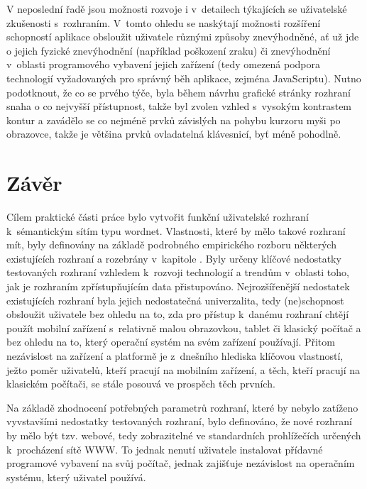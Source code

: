 \documentclass[a4paper,11pt,openany,twoside]{book}
\newcommand{\itNameRef}[1]{\textit{\nameref{#1}}}
\begin{document}
			V neposlední řadě jsou možnosti rozvoje i v~detailech týkajících se uživatelské zkušenosti s~rozhraním. V~tomto ohledu se naskýtají možnosti rozšíření schopností aplikace obsloužit uživatele různými způsoby znevýhodněné, ať už jde o jejich fyzické znevýhodnění (například poškození zraku) či znevýhodnění v~oblasti programového vybavení jejich zařízení (tedy omezená podpora technologií vyžadovaných pro správný běh aplikace, zejména JavaScriptu). Nutno podotknout, že co se prvého týče, byla během návrhu grafické stránky rozhraní snaha o co nejvyšší přístupnost, takže byl zvolen vzhled s~vysokým kontrastem kontur a zavádělo se co nejméně prvků závislých na pohybu kurzoru myši po obrazovce, takže je většina prvků ovladatelná klávesnicí, byť méně pohodlně. 

		\chapter*{Závěr}\label{zaver}



			Cílem praktické části práce bylo vytvořit funkční uživatelské rozhraní k~sémantickým sítím typu wordnet. Vlastnosti, které by mělo takové rozhraní mít, byly definovány na základě podrobného empirického rozboru některých existujících rozhraní a rozebrány v~kapitole \itNameRef{cha:navrh}. Byly určeny klíčové nedostatky testovaných rozhraní vzhledem k~rozvoji technologií a trendům v~oblasti toho, jak je rozhraním zpřístupňujícím data přistupováno. Nejrozšířenější nedostatek existujících rozhraní byla jejich nedostatečná univerzalita, tedy (ne)schopnost obsloužit uživatele bez ohledu na to, zda pro přístup k~danému rozhraní chtějí použít mobilní zařízení s~relativně malou obrazovkou, tablet či klasický počítač a bez ohledu na to, který operační systém na svém zařízení používají. Přitom nezávislost na zařízení a platformě je z~dnešního hlediska klíčovou vlastností, ježto poměr uživatelů, kteří pracují na mobilním zařízení, a těch, kteří pracují na klasickém počítači, se stále posouvá ve prospěch těch prvních.

			Na základě zhodnocení potřebných parametrů rozhraní, které by nebylo zatíženo vyvstavšími nedostatky testovaných rozhraní, bylo definováno, že nové rozhraní by mělo být tzv. webové, tedy zobrazitelné ve standardních prohlížečích určených k~procházení sítě WWW. To jednak nenutí uživatele instalovat přídavné programové vybavení na svůj počítač, jednak zajišťuje nezávislost na operačním systému, který uživatel používá. 
\end{document}
